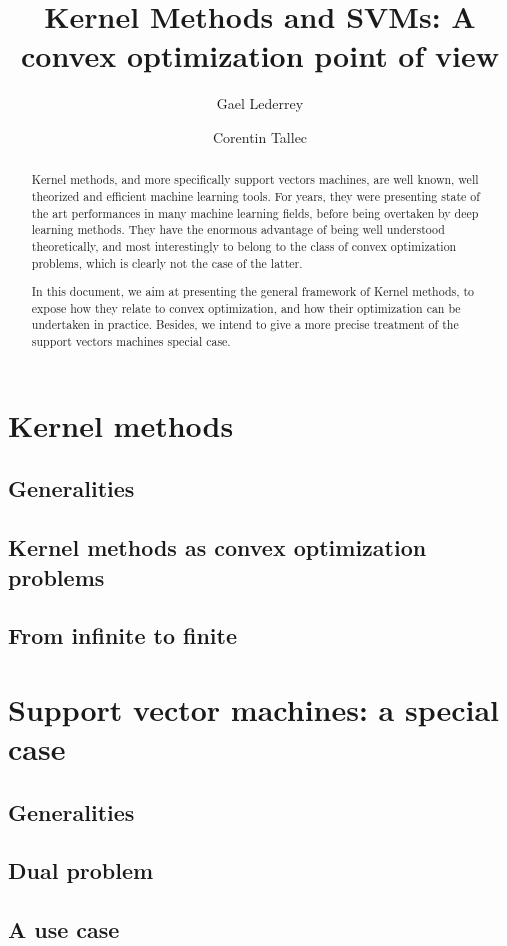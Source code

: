 \documentclass[a4paper, 11pt]{article}
\title{Kernel Methods and SVMs:
A convex optimization point of view}
\author{Gael Lederrey\\
  \and
Corentin Tallec}
\begin{document}
\maketitle
\begin{abstract}
  Kernel methods, and more specifically support vectors machines, are
  well known, well theorized and efficient machine learning tools. For
  years, they were presenting state of the art performances in many
  machine learning fields, before being overtaken by deep learning
  methods. They have the enormous advantage of being well understood
  theoretically, and most interestingly to belong to the class of
  convex optimization problems, which is clearly not the case of the
  latter.

  In this document, we aim at presenting the general framework of
  Kernel methods, to expose how they relate to convex optimization,
  and how their optimization can be undertaken in practice. Besides,
  we intend to give a more precise treatment of the support vectors
  machines special case.
\end{abstract}
\section{Kernel methods}
\subsection{Generalities}
\subsection{Kernel methods as convex optimization problems}
\subsection{From infinite to finite}
\section{Support vector machines: a special case}
\subsection{Generalities}
\subsection{Dual problem}
\subsection{A use case}
\end{document}
